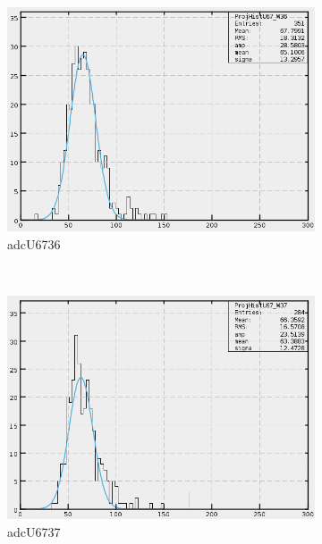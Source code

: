 \begin{figure}[h]
\begin{subfigure}[h]{0.3\textwidth}
        \includegraphics[width=\textwidth, keepaspectratio = true]{adcU67_36}
        \caption{adcU6736}
        \label{fig:adcU67_36}
    \end{subfigure}
    ~
    \begin{subfigure}[h]{0.3\textwidth}
        \centering
        \includegraphics[width=\textwidth, keepaspectratio = true]{adcU67_37}
        \caption{adcU6737}
        \label{fig:adcU67_37}
    \end{subfigure}
    \\
    \begin{subfigure}[h]{0.3\textwidth}
        \centering

\end{subfigure}
\end{figure}
